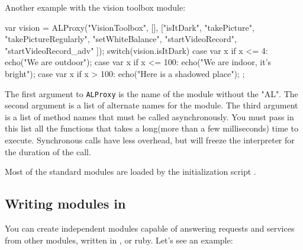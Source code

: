 Another example with the vision toolbox module:
\begin{urbiunchecked}
var vision = ALProxy("VisionToolbox", [], ["isItDark",
  "takePicture", "takePictureRegularly", "setWhiteBalance",
  "startVideoRecord", "startVideoRecord_adv" ]);
switch(vision.isItDark)
{
  case var x if x <= 4:
    echo("We are outdoor");
  case var x if x <= 100:
    echo("We are indoor, it's bright");
  case var x if x > 100:
    echo("Here is a shadowed place");
};
\end{urbiunchecked}

The first argument to \lstinline|ALProxy| is the name of the module without
the "AL". The second argument is a list of alternate names for the module.
The third argument is a list of method names that must be called
asynchronously.  You must pass in this list all the functions that takes a
long(more than a few milliseconds) time to execute. Synchronous calls have
less overhead, but will freeze the \us interpreter for the duration of the
call.

Most of the standard modules are loaded by the initialization script
.

\subsection{Writing \naoqi modules in \urbi}

You can create independent modules capable of answering requests and
services from other \naoqi modules, written in \Cxx, \us or
ruby. Let's see an example:

